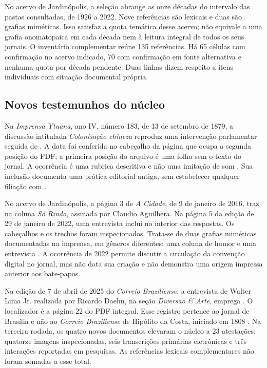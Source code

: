No acervo de Jardinópolis, a seleção abrange as onze décadas do intervalo das pastas consultadas, de 1926 a 2022. Nove referências são lexicais e duas são grafias miméticas. Isso satisfaz a quota temática desse acervo; não equivale a uma grafia onomatopaica em cada década nem à leitura integral de todos os seus jornais. O inventário complementar reúne 135 referências. Há 65 células com confirmação no acervo indicado, 70 com confirmação em fonte alternativa e nenhuma quota por década pendente. Duas linhas dizem respeito a itens individuais com situação documental própria.

\subsection{Novos testemunhos do núcleo}

Na \textit{Imprensa Ytuana}, ano IV, número 183, de 13 de setembro de 1879, a discussão intitulada \textit{Colonisação chineza} reproduz uma intervenção parlamentar seguida de . A data foi conferida no cabeçalho da página que ocupa a segunda posição do PDF; a primeira posição do arquivo é uma folha sem o texto do jornal. A ocorrência é uma rubrica descritiva e não uma imitação de som \cite{r3doc1}. Sua inclusão documenta uma prática editorial antiga, sem estabelecer qualquer filiação com .

No acervo de Jardinópolis, a página 3 de \textit{A Cidade}, de 9 de janeiro de 2016, traz  na coluna \textit{Só Rindo}, assinada por Claudio Aguilhera. Na página 5 da edição de 29 de janeiro de 2022, uma entrevista inclui  no interior das respostas. Os cabeçalhos e os trechos foram inspecionados. Trata-se de duas grafias miméticas documentadas na imprensa, em gêneros diferentes: uma coluna de humor e uma entrevista \cite{r3doc18,r3doc19}. A ocorrência de 2022 permite discutir a circulação da convenção digital no jornal, mas não data sua criação e não demonstra uma origem impressa anterior aos bate-papos.

Na edição de 7 de abril de 2025 do \textit{Correio Braziliense}, a entrevista de Walter Lima Jr. realizada por Ricardo Daehn, na seção \textit{Diversão \& Arte}, emprega . O localizador é a página 22 do PDF integral. Esse registro pertence ao jornal de Brasília e não ao \textit{Correio Braziliense} de Hipólito da Costa, iniciado em 1808 \cite{r3doc21,r3archiveH06}. Na terceira rodada, os quatro novos documentos elevaram o núcleo a 23 atestações: quatorze imagens inspecionadas, seis transcrições primárias eletrônicas e três interações reportadas em pesquisas. As referências lexicais complementares não foram somadas a esse total.

